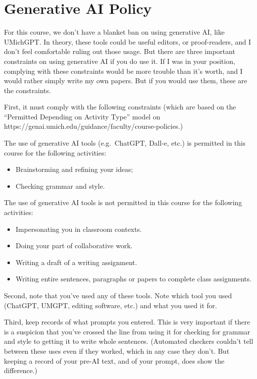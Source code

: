 \documentclass[
  12pt,
  letterpaper,
  DIV=11,
  numbers=noendperiod]{scrartcl}
\providecommand{\tightlist}{%
  \setlength{\itemsep}{0pt}\setlength{\parskip}{0pt}}\usepackage{longtable,booktabs,array}
\begin{document}
\section{Generative AI Policy}\label{generative-ai-policy}

For this course, we don't have a blanket ban on using generative AI,
like UMichGPT. In theory, these tools could be useful editors, or
proof-readers, and I don't feel comfortable ruling out those usage. But
there are three important constraints on using generative AI if you do
use it. If I was in your position, complying with these constraints
would be more trouble than it's worth, and I would rather simply write
my own papers. But if you would use them, these are the constraints.

First, it must comply with the following constraints (which are based on
the ``Permitted Depending on Activity Type'' model on
https://genai.umich.edu/guidance/faculty/course-policies.)

The use of generative AI tools (e.g.~ChatGPT, Dall-e, etc.) is permitted
in this course for the following activities:

\begin{itemize}
\tightlist
\item
  Brainstorming and refining your ideas;
\item
  Checking grammar and style.
\end{itemize}

The use of generative AI tools is not permitted in this course for the
following activities:

\begin{itemize}
\tightlist
\item
  Impersonating you in classroom contexts.
\item
  Doing your part of collaborative work.
\item
  Writing a draft of a writing assignment.
\item
  Writing entire sentences, paragraphs or papers to complete class
  assignments.
\end{itemize}

Second, note that you've used any of these tools. Note which tool you
used (ChatGPT, UMGPT, editing software, etc.) and what you used it for.

Third, keep records of what prompts you entered. This is very important
if there is a suspicion that you've crossed the line from using it for
checking for grammar and style to getting it to write whole sentences.
(Automated checkers couldn't tell between these uses even if they
worked, which in any case they don't. But keeping a record of your
pre-AI text, and of your prompt, does show the difference.)
\end{document}

